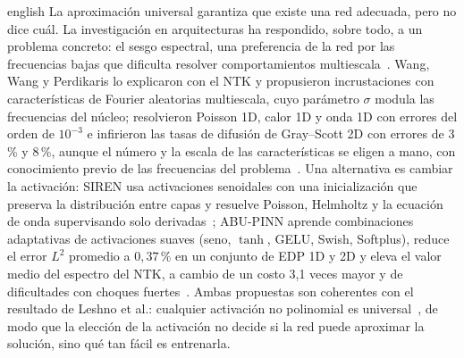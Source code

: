 \documentclass[0000.tex]{subfiles}
\begin{document}
\begin{hyphenrules}{english}
La aproximación universal garantiza que existe una red adecuada, pero no dice cuál. La investigación en arquitecturas ha respondido, sobre todo, a un problema concreto: el sesgo espectral, una preferencia de la red por las frecuencias bajas que dificulta resolver comportamientos multiescala~\cite{cuomo2022scientific}. Wang, Wang y Perdikaris lo explicaron con el NTK y propusieron incrustaciones con características de Fourier aleatorias multiescala, cuyo parámetro $\sigma$ modula las frecuencias del núcleo; resolvieron Poisson 1D, calor 1D y onda 1D con errores del orden de $10^{-3}$ e infirieron las tasas de difusión de Gray--Scott 2D con errores de $3$\,\% y $8$\,\%, aunque el número y la escala de las características se eligen a mano, con conocimiento previo de las frecuencias del problema~\cite{wang2021eigenvector}. Una alternativa es cambiar la activación: SIREN usa activaciones senoidales con una inicialización que preserva la distribución entre capas y resuelve Poisson, Helmholtz y la ecuación de onda supervisando solo derivadas~\cite{sitzmann2020implicit}; ABU-PINN aprende combinaciones adaptativas de activaciones suaves (seno, $\tanh$, GELU, Swish, Softplus), reduce el error $L^2$ promedio a $0{,}37$\,\% en un conjunto de EDP 1D y 2D y eleva el valor medio del espectro del NTK, a cambio de un costo 3,1 veces mayor y de dificultades con choques fuertes~\cite{wang2023learning}. Ambas propuestas son coherentes con el resultado de Leshno et al.: cualquier activación no polinomial es universal~\cite{leshno1993multilayer}, de modo que la elección de la activación no decide si la red puede aproximar la solución, sino qué tan fácil es entrenarla.


\end{hyphenrules}
\end{document}
